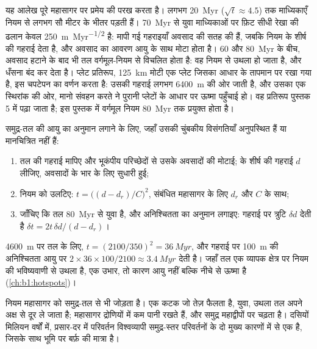 यह आलेख पूरे महासागर पर प्रमेय की परख करता है। लगभग \qty{20}{Myr} ($\sqrt t \approx 4.5$) तक माध्यिकाएँ नियम से लगभग सौ मीटर के भीतर पड़ती हैं। \qty{70}{Myr} से युवा माध्यिकाओं पर फ़िट सीधी रेखा की ढलान केवल \qty{250}{m.Myr^{-1/2}} है: मापी गई गहराइयाँ अवसाद की सतह की हैं, जबकि नियम  के शीर्ष की गहराई देता है, और अवसाद का आवरण आयु के साथ मोटा होता है। 60 और \qty{80}{Myr} के बीच, अवसाद हटाने के बाद भी तल वर्गमूल-नियम से विचलित होता है: वह नियम से उथला हो जाता है, और धँसना बंद कर देता है।
प्लेट प्रतिरूप, \qty{125}{km} मोटी एक प्लेट जिसका आधार  के तापमान पर रखा गया है, इस चपटेपन का वर्णन करता है: उसकी गहराई लगभग \qty{6400}{m} की ओर जाती है, और उसका  एक स्थिरांक की ओर, मानो संवहन करते  ने पुरानी प्लेटों के आधार पर ऊष्मा पहुँचाई हो। वह प्रतिरूप पुस्तक 5 में पढ़ा जाता है; इस पुस्तक में वर्गमूल नियम \qty{80}{Myr} तक प्रयुक्त होता है।

\begin{method}\label{met:b1:rifts-ridges-margins:age-from-depth}
समुद्र-तल की आयु का अनुमान लगाने के लिए, जहाँ उसकी चुंबकीय विसंगतियाँ अनुपस्थित हैं या मानचित्रित नहीं हैं:
\begin{enumerate}
  \item तल की गहराई मापिए और भूकंपीय परिच्छेदों से उसके अवसादों की मोटाई;  के शीर्ष की गहराई $d$ लीजिए, अवसादों के भार के लिए सुधारी हुई;
  \item नियम को उलटिए: $t = \bigl((d - d_r)/C\bigr)^2$, संबंधित महासागर के लिए $d_r$ और $C$ के साथ;
  \item जाँचिए कि तल \qty{80}{Myr} से युवा है, और अनिश्चितता का अनुमान लगाइए: गहराई पर त्रुटि $\delta d$ देती है $\delta t = 2t\,\delta d/(d - d_r)$।
\end{enumerate}
\end{method}

\qty{4600}{m} पर तल के लिए, $t = (2100/350)^2 = \qty{36}{Myr}$, और गहराई पर \qty{100}{m} की अनिश्चितता आयु पर $2\times36\times100/2100 \approx
\qty{3.4}{Myr}$ देती है। जहाँ तल एक व्यापक क्षेत्र पर नियम की भविष्यवाणी से उथला है, एक उभार, तो कारण आयु नहीं बल्कि नीचे से ऊष्मा है (\cref{ch:b1:hotspots})।

नियम महासागर को समुद्र-तल से भी जोड़ता है। एक कटक जो तेज़ फैलता है, युवा, उथला तल अपने अक्ष से दूर ले जाता है; महासागर द्रोणियों में कम पानी रखते हैं, और समुद्र महाद्वीपों पर चढ़ता है। दसियों मिलियन वर्षों में, प्रसार-दर में परिवर्तन विश्वव्यापी समुद्र-स्तर परिवर्तनों के दो मुख्य कारणों में से एक है, जिसके साथ भूमि पर बर्फ़ की मात्रा है।

